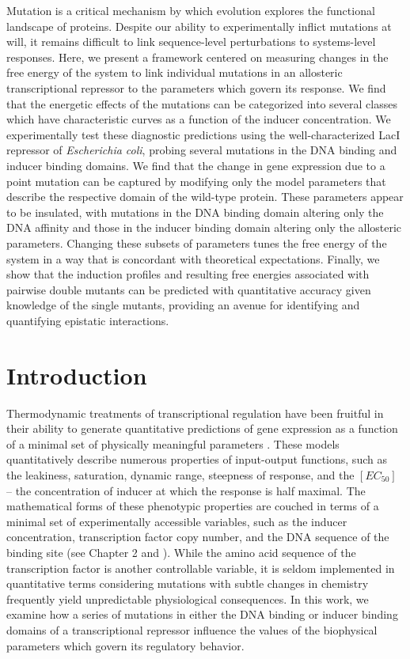 \documentclass[12pt]{caltech_thesis}
\begin{document}
Mutation is a critical mechanism by which evolution explores the
functional landscape of proteins. Despite our ability to experimentally
inflict mutations at will, it remains difficult to link sequence-level
perturbations to systems-level responses. Here, we present a framework
centered on measuring changes in the free energy of the system to link
individual mutations in an allosteric transcriptional repressor to the
parameters which govern its response. We find that the energetic effects
of the mutations can be categorized into several classes which have
characteristic curves as a function of the inducer concentration. We
experimentally test these diagnostic predictions using the
well-characterized LacI repressor of \emph{Escherichia coli}, probing
several mutations in the DNA binding and inducer binding domains. We
find that the change in gene expression due to a point mutation can be
captured by modifying only the model parameters that describe the
respective domain of the wild-type protein. These parameters appear to
be insulated, with mutations in the DNA binding domain altering only the
DNA affinity and those in the inducer binding domain altering only the
allosteric parameters. Changing these subsets of parameters tunes the
free energy of the system in a way that is concordant with theoretical
expectations. Finally, we show that the induction profiles and resulting
free energies associated with pairwise double mutants can be predicted
with quantitative accuracy given knowledge of the single mutants,
providing an avenue for identifying and quantifying epistatic
interactions.

\hypertarget{introduction-2}{%
\section{Introduction}\label{introduction-2}}

Thermodynamic treatments of transcriptional regulation have been
fruitful in their ability to generate quantitative predictions of gene
expression as a function of a minimal set of physically meaningful
parameters
\autocite{ackers1982,buchler2003,vilar2003,garcia2011,daber2009a,brewster2014,weinert2014,rydenfelt2014b,razo-mejia2014,razo-mejia2018,bintu2005,bintu2005a,kuhlman2007}.
These models quantitatively describe numerous properties of input-output
functions, such as the leakiness, saturation, dynamic range, steepness
of response, and the \([EC_{50}]\) -- the concentration of inducer at
which the response is half maximal. The mathematical forms of these
phenotypic properties are couched in terms of a minimal set of
experimentally accessible variables, such as the inducer concentration,
transcription factor copy number, and the DNA sequence of the binding
site (see Chapter 2 and \textcite{razo-mejia2018}). While the amino acid
sequence of the transcription factor is another controllable variable,
it is seldom implemented in quantitative terms considering mutations
with subtle changes in chemistry frequently yield unpredictable
physiological consequences. In this work, we examine how a series of
mutations in either the DNA binding or inducer binding domains of a
transcriptional repressor influence the values of the biophysical
parameters which govern its regulatory behavior.
\end{document}

